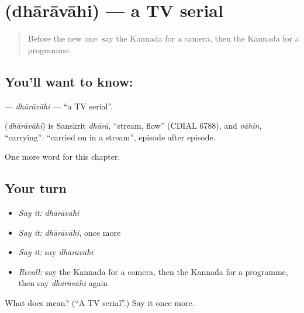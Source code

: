 \section[\texorpdfstring{\kn{ಧಾರಾವಾಹಿ} (dhārāvāhi)}{ಧಾರಾವಾಹಿ (dhārāvāhi)}]{ (dhārāvāhi) — a TV serial}

\label{lesson:KA-C300-dharavahi}



\begin{quote}
Before the new one: say the Kannada for a camera, then the Kannada for a programme.
\end{quote}

\subsection*{You'll want to know: }
\textbf{} — \emph{dhārāvāhi} — \textquotedblleft{}a TV serial\textquotedblright{}.

\begin{cousinweb}
\textbf{} (\emph{dhārāvāhi}) is Sanskrit \emph{dhārā}, \textquotedblleft{}stream, flow\textquotedblright{} (CDIAL 6788), and \emph{vāhin}, \textquotedblleft{}carrying\textquotedblright{}: \textquotedblleft{}carried on in a stream\textquotedblright{}, episode after episode.
\end{cousinweb}

\begin{grammarlens}[title={What you've built}]
One more word for this chapter.
\end{grammarlens}

\subsection*{Your turn}
\begin{itemize}
\raggedright
  \item \emph{Say it:} \emph{dhārāvāhi}
  \item \emph{Say it:} \emph{dhārāvāhi}, once more
  \item \emph{Say it:} say \emph{dhārāvāhi}
  \item \emph{Recall:} say the Kannada for a camera, then the Kannada for a programme, then say \emph{dhārāvāhi} again
\end{itemize}

\begin{tcolorbox}[breakable,colback=teal!4,colframe=teal!35!black,title={Before you move on}]
What does  mean? (\textquotedblleft{}A TV serial\textquotedblright{}.) Say it once more.
\end{tcolorbox}
